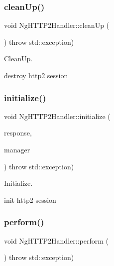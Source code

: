 \subsubsection{\texorpdfstring{clean\+Up()}{cleanUp()}}
{\footnotesize\ttfamily void Ng\+H\+T\+T\+P2\+Handler\+::clean\+Up (\begin{DoxyParamCaption}\item[{void}]{ }\end{DoxyParamCaption}) throw  std\+::exception) }



Clean\+Up. 

destroy http2 session \mbox{\label{classNetwork_1_1HTTP2_1_1NgHTTP2Handler_a8fda32f531a6a3946dc861b06c519c95}} 
\subsubsection{\texorpdfstring{initialize()}{initialize()}}
{\footnotesize\ttfamily void Ng\+H\+T\+T\+P2\+Handler\+::initialize (\begin{DoxyParamCaption}\item[{\hyperlink{structNetwork_1_1HTTP2_1_1HTTP2HandlerResponse}{H\+T\+T\+P2\+Handler\+Response} $\ast$}]{response,  }\item[{\hyperlink{classNetwork_1_1HTTP2_1_1NgHTTP2ResponseManager}{Ng\+H\+T\+T\+P2\+Response\+Manager} $\ast$}]{manager }\end{DoxyParamCaption}) throw  std\+::exception) }



Initialize. 

init http2 session \mbox{\label{classNetwork_1_1HTTP2_1_1NgHTTP2Handler_a0ffcd7addf3ea2dc9467312e3a45efff}} 
\subsubsection{\texorpdfstring{perform()}{perform()}}
{\footnotesize\ttfamily void Ng\+H\+T\+T\+P2\+Handler\+::perform (\begin{DoxyParamCaption}\item[{void}]{ }\end{DoxyParamCaption}) throw  std\+::exception) }



